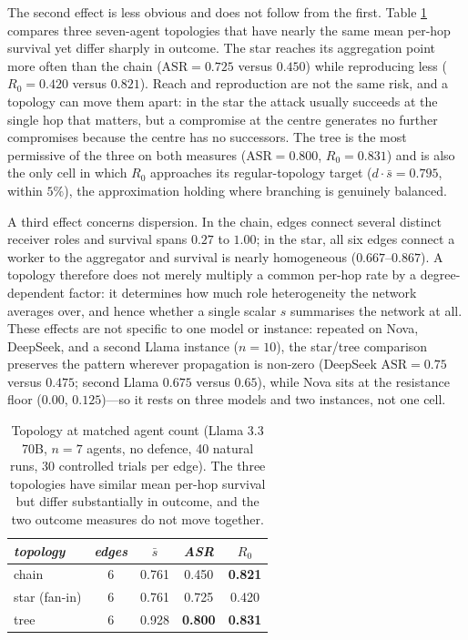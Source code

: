 \documentclass[sigconf,anonymous]{aamas}
\begin{document}
The second effect is less obvious and does not follow from the first. Table
\ref{tab:topo} compares three seven-agent topologies that have nearly the same mean
per-hop survival yet differ sharply in outcome. The star reaches its aggregation
point more often than the chain ($\mathrm{ASR} = 0.725$ versus $0.450$) while
reproducing less ($R_0 = 0.420$ versus $0.821$). Reach and reproduction are not the
same risk, and a topology can move them apart: in the star the attack usually
succeeds at the single hop that matters, but a compromise at the centre generates
no further compromises because the centre has no successors. The tree is the most
permissive of the three on both measures ($\mathrm{ASR} = 0.800$,
$R_0 = 0.831$) and is also the only cell in which $R_0$ approaches its
regular-topology target ($d\cdot\bar s = 0.795$, within $5\%$), the approximation
holding where branching is genuinely balanced.

A third effect concerns dispersion. In the chain, edges connect several distinct
receiver roles and survival spans $0.27$ to $1.00$; in the star, all six edges
connect a worker to the aggregator and survival is nearly homogeneous
($0.667$--$0.867$). A topology therefore does not merely multiply a common per-hop
rate by a degree-dependent factor: it determines how much role heterogeneity the
network averages over, and hence whether a single scalar $s$ summarises the network
at all. These effects are not specific to one model or instance: repeated on Nova,
DeepSeek, and a second Llama instance ($n = 10$), the star/tree comparison preserves
the pattern wherever propagation is non-zero (DeepSeek $\mathrm{ASR} = 0.75$ versus
$0.475$; second Llama $0.675$ versus $0.65$), while Nova sits at the resistance floor
($0.00$, $0.125$)---so it rests on three models and two instances, not one cell.

\begin{table}[t]
\small
\caption{Topology at matched agent count (Llama 3.3 70B, $n=7$ agents, no
defence, 40 natural runs, 30 controlled trials per edge). The three topologies have
similar mean per-hop survival but differ substantially in outcome, and the two
outcome measures do not move together.}
\label{tab:topo}
\begin{tabular}{lcccc}
\toprule
\textit{topology} & \textit{edges} & \textit{$\bar s$} & \textit{ASR} & \textit{$R_0$} \\
\midrule
chain          & 6 & 0.761 & 0.450 & \textbf{0.821} \\
star (fan-in)  & 6 & 0.761 & 0.725 & 0.420 \\
tree           & 6 & 0.928 & \textbf{0.800} & \textbf{0.831} \\
\bottomrule
\end{tabular}
\end{table}
\end{document}
